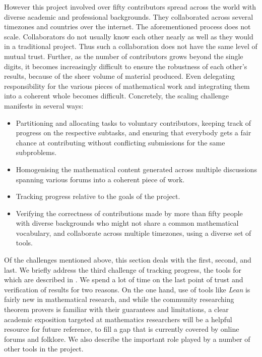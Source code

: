 However this project involved over fifty contributors spread across the world with diverse academic and professional backgrounds. They collaborated across several timezones and countries over the internet. The aforementioned process does not scale. Collaborators do not usually know each other nearly as well as they would in a traditional project. Thus such a collaboration does not have the same level of mutual trust. Further, as the number of contributors grows beyond the single digits, it becomes increasingly difficult to ensure the robustness of each other's results, because of the sheer volume of material produced. Even delegating responsibility for the various pieces of mathematical work and integrating them into a coherent whole becomes difficult. Concretely, the scaling challenge manifests in several ways:
\begin{itemize}
    \item Partitioning and allocating tasks to voluntary contributors, keeping track of progress on the respective subtasks, and ensuring that everybody gets a fair chance at contributing without conflicting submissions for the same subproblems.
    \item Homogenising the mathematical content generated across multiple discussions spanning various forums into a coherent piece of work.
    \item Tracking progress relative to the goals of the project.
    \item Verifying the correctness of contributions made by more than fifty people with diverse backgrounds who might not share a common mathematical vocabulary, and collaborate across multiple timezones, using a diverse set of tools.
\end{itemize}

Of the challenges mentioned above, this section deals with the first, second, and last. We briefly address the third challenge of tracking progress, the tools for which are described in . We spend a lot of time on the last point of trust and verification of results for two reasons. On the one hand, use of tools like \emph{Lean} is fairly new in mathematical research, and while the community researching theorem provers is familiar with their guarantees and limitations, a clear academic exposition targeted at mathematics researchers will be a helpful resource for future reference, to fill a gap that is currently covered by online forums and folklore. We also describe the important role played by a number of other tools in the project.

